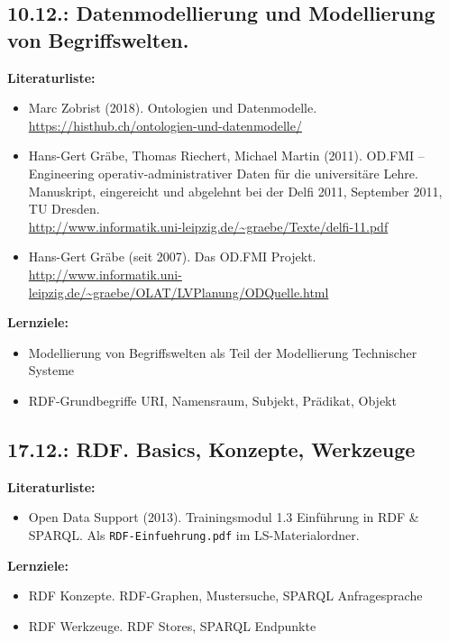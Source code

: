 \documentclass[11pt,a4paper]{article}
\begin{document}
\subsection{10.12.: Datenmodellierung und Modellierung von Begriffswelten.}

\textbf{Literaturliste:}
\begin{itemize}[noitemsep]
\item Marc Zobrist (2018). Ontologien und Datenmodelle. \\
  \url{https://histhub.ch/ontologien-und-datenmodelle/}
\item Hans-Gert Gräbe, Thomas Riechert, Michael Martin (2011).  OD.FMI –
  Engineering operativ-administrativer Daten für die universitäre Lehre.
  Manuskript, eingereicht und abgelehnt bei der Delfi 2011, September 2011, TU
  Dresden. \\
  \url{http://www.informatik.uni-leipzig.de/~graebe/Texte/delfi-11.pdf}
\item Hans-Gert Gräbe (seit 2007). Das OD.FMI Projekt. \\
  {\small \url{http://www.informatik.uni-leipzig.de/~graebe/OLAT/LVPlanung/ODQuelle.html}}
\end{itemize}

\textbf{Lernziele:}
\begin{itemize}[noitemsep]
\item Modellierung von Begriffswelten als Teil der Modellierung Technischer
  Systeme
\item RDF-Grundbegriffe URI, Namensraum, Subjekt, Prädikat, Objekt
\end{itemize}

\subsection{17.12.: RDF. Basics, Konzepte, Werkzeuge}

\textbf{Literaturliste:}
\begin{itemize}
\item Open Data Support (2013). Trainingsmodul 1.3 Einführung
  in RDF \& SPARQL.  Als \texttt{RDF-Einfuehrung.pdf} im LS-Materialordner.
\end{itemize}

\textbf{Lernziele:}
\begin{itemize}[noitemsep]
\item RDF Konzepte. RDF-Graphen, Mustersuche, SPARQL Anfragesprache
\item RDF Werkzeuge. RDF Stores, SPARQL Endpunkte
\end{itemize}
\end{document}
